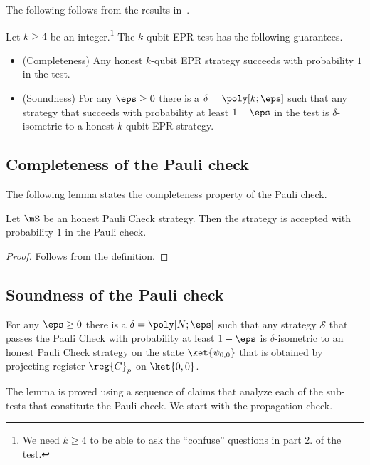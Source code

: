 The following follows from the results in~\cite{chao2016test}. 

\begin{theorem}\label{thm:epr-test}
Let $k \geq 4$ be an integer.\footnote{We need $k\geq 4$ to be able to ask the ``confuse'' questions in part 2. of the test.} The $k$-qubit EPR test has the following guarantees. 
\begin{itemize}
\item (Completeness) Any honest $k$-qubit EPR strategy succeeds with probability $1$ in the test. 
\item (Soundness) For any $\eps\geq 0$ there is a $\delta = \poly[k;\eps]$ such that any strategy that succeeds with probability at least $1-\eps$ in the test is $\delta$-isometric to a honest $k$-qubit EPR strategy. 
\end{itemize}
\end{theorem}

\subsection{Completeness of the Pauli check}

The following lemma states the completeness property of the Pauli check. 

\begin{lemma}\label{lem:paulicheck-compleness}
Let $\mS$ be an honest Pauli Check strategy. Then the strategy is accepted with probability $1$ in the Pauli check.
\end{lemma}

\begin{proof}
Follows from the definition. 
\end{proof}

\subsection{Soundness of the Pauli check}

\begin{lemma}\label{lem:paulicheck-soundness}
 For any $\eps\geq 0$ there is a $\delta = \poly[N;\eps]$ such that any strategy $\mathcal{S}$ that passes the Pauli Check with probability at least $1 - \eps$ is $\delta$-isometric to an honest Pauli Check strategy on the state $\ket{\psi_{0,0}}$ that is obtained by projecting register $\reg{C}_p$ on $\ket{0,0}$. 
\end{lemma}

The lemma is proved using a sequence of claims that analyze each of the sub-tests that constitute the Pauli check. We start with the propagation check. 

